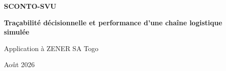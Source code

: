 \documentclass[11pt,a4paper,oneside]{report}
\begin{document}
\begin{titlepage}
  \centering
  \vspace*{2cm}
  {\ArialBlackFont\bfseries\fontsize{20}{24}\selectfont SCONTO-SVU\par}
  \vspace{0.8cm}
  {\ArialFont\bfseries\fontsize{16}{19}\selectfont Traçabilité décisionnelle et performance d'une chaîne logistique simulée\par}
  \vspace{0.6cm}
  {\Large Application à ZENER SA Togo\par}
  \vfill
  {\large Août 2026\par}
\end{titlepage}


\tableofcontents
\listoffigures
\listoftables

\clearpage














\appendix
\setcounter{chapter}{3}


\end{document}
